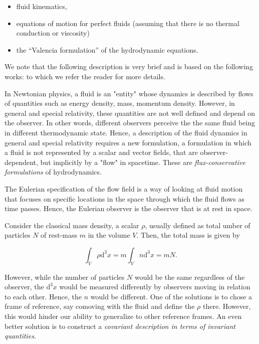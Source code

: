 \begin{itemize}
    \item fluid kinematics,
    \item equations of motion for perfect fluids (assuming that there is no thermal conduction or viscosity)
    \item the “Valencia formulation” of the hydrodynamic equations.
\end{itemize}


We note that the following description is very brief and is based on the following works: \cite{Misner:1973,Schutz:2009a,Gourgoulhon:2006bn,Andersson:2006nr,Rezzolla:2013} to which we refer the reader for more details.

In Newtonian physics, a fluid is an "entity" whose dynamics is described by flows of quantities such as energy density, mass, momentum density. 
However, in general and special relativity, these quantities are not well defined and depend on the observer. 
In other words, different observers perceive the the same fluid being in different thermodynamic state. 
Hence, a description of the fluid dynamics in general and special relativity requires a new formulation, a formulation in which a fluid is not represented by a scalar and vector fields, that are observer-dependent, but implicitly by a "flow" in spacetime. 
These are \textit{flux-conservative formulations} of hydrodynamics.

The Eulerian specification of the flow field is a way of looking at fluid motion that focuses on specific locations in the space through which the fluid flows as time passes. Hence, the Eulerian observer is the observer that is at rest in space.

Consider the classical mass density, a scalar $\rho$, usually defined as total umber of particles $N$ of rest-mass $m$ in the volume $V$. Then, the total mass is given by

\begin{equation}
\int_V \rho \text{d}^3x = m\int_V n \text{d}^3 x = mN.
\end{equation}

However, while the number of particles $N$ would be the same regardless of the observer, the $\text{d}^3x$ would be measured differently by observers moving in relation to each other. 
Hence, the $n$ would be different. 
One of the solutions is to chose a frame of reference, say comoving with the fluid and define the $\rho$ there. However, this would hinder our ability to generalize to other reference frames.
An even better solution is to construct a \textit{covariant description in terms of invariant quantities}. 

